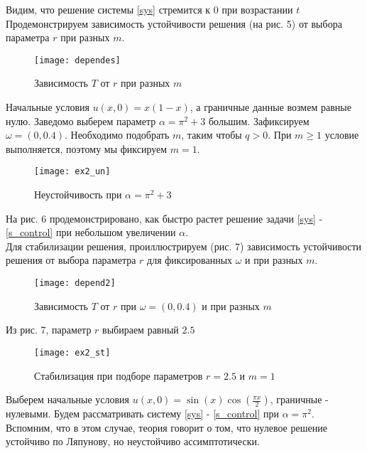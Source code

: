 Видим, что решение системы \eqref{sys} стремится к $0$ при возрастании $t$\\

Продемонстрируем зависимость устойчивости решения (на рис. 5) от выбора параметра $r$ при разных $m$.

\begin{figure}[H]
  \centering
  \texttt{[image: dependes]}
  \caption{Зависимость $T$ от $r$ при разных $m$}
\end{figure}

\begin{exmp}
\end{exmp}

Начальные условия $u(x, 0) = x(1 - x)$, а граничные данные возмем равные нулю. Заведомо выберем параметр $\alpha = \pi^2 + 3$ большим. Зафиксируем $\omega = (0, 0.4)$. Необходимо подобрать $m$, таким чтобы $q > 0$. При $m \ge 1$ условие выполняется, поэтому мы фиксируем $m = 1$.

\begin{figure}[H]
  \centering
  \texttt{[image: ex2\_un]}
  \caption{Неустойчивость при $\alpha = \pi^2 + 3$}
\end{figure}

На рис. 6 продемонстрировано, как быстро растет решение задачи \eqref{sys} - \eqref{s_control} при небольшом увеличении $\alpha$.\\

Для стабилизации решения, проиллюстрируем (рис. 7) зависимость устойчивости решения от выбора параметра $r$ для фиксированных $\omega$ и при разных $m$.

\begin{figure}[H]
  \centering
  \texttt{[image: depend2]}
  \caption{Зависимость $T$ от $r$ при $\omega = (0, 0.4)$ и при разных $m$}
\end{figure}

Из рис. 7, параметр $r$ выбираем равный $2.5$

\begin{figure}[H]
  \centering
  \texttt{[image: ex2\_st]}
  \caption{Стабилизация при подборе параметров $r = 2.5$ и $m = 1$}
\end{figure}

\begin{exmp}
\end{exmp}

Выберем начальные условия $u(x, 0) = \sin({x}) \cos({\frac{\pi x}{2}})$, граничные - нулевыми. Будем рассматривать систему \eqref{sys} - \eqref{s_control} при $\alpha = \pi^2$. Вспомним, что в этом случае, теория говорит о том, что нулевое решение устойчиво по Ляпунову, но неустойчиво ассимптотически.

